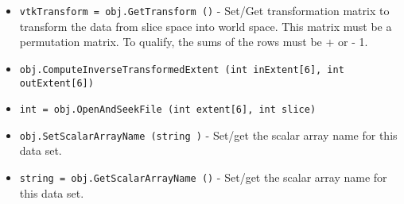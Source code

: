 \begin{itemize}
\item  \verb|vtkTransform = obj.GetTransform ()| -  Set/Get transformation matrix to transform the data from slice space
 into world space. This matrix must be a permutation matrix. To qualify,
 the sums of the rows must be + or - 1.

\item  \verb|obj.ComputeInverseTransformedExtent (int inExtent[6], int outExtent[6])|

\item  \verb|int = obj.OpenAndSeekFile (int extent[6], int slice)|

\item  \verb|obj.SetScalarArrayName (string )| -  Set/get the scalar array name for this data set.

\item  \verb|string = obj.GetScalarArrayName ()| -  Set/get the scalar array name for this data set.

\end{itemize}
